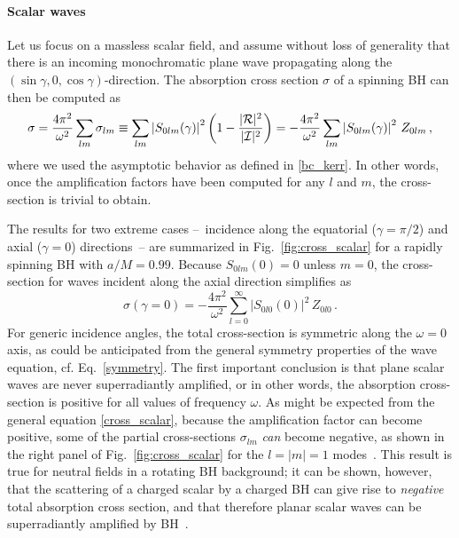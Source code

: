 \documentclass[11pt]{article}
\newcommand{\be}{\begin{equation}}
\newcommand{\ee}{\end{equation}}
\numberwithin{equation}{section} %
\begin{document}
\paragraph{Scalar waves}
Let us focus on a massless scalar field, and assume without loss of generality that there is an incoming monochromatic plane wave propagating along the $(\sin\gamma,0,\cos\gamma)$-direction. The absorption cross section $\sigma$ of a spinning BH can then be computed as~\cite{Unruh:1976fm,Macedo:2013afa}
%
\be
\sigma=\frac{4\pi^2}{\omega^2}\sum_{lm}\sigma_{lm}\equiv\sum_{lm}\left|S_{0lm}(\gamma)\right|^2\left(1-\frac{|{\cal R}|^2}{|{\cal I}|^2}\right)=-\frac{4\pi^2}{\omega^2}\sum_{lm}\left|S_{0lm}(\gamma)\right|^2\,Z_{0lm}\,,\label{cross_scalar}
\ee
%
where we used the asymptotic behavior as defined in \eqref{bc_kerr}. In other words, once the amplification factors have been computed for any $l$ and $m$, the cross-section is trivial to obtain. 

The results for two extreme cases --~incidence along the equatorial ($\gamma=\pi/2$) and axial ($\gamma=0$) directions~-- are summarized in Fig.~\ref{fig:cross_scalar}
for a rapidly spinning BH with $a/M=0.99$. Because $S_{0lm}(0)=0$ unless $m=0$, the cross-section for waves incident along the axial direction simplifies as
\begin{equation}
 \sigma(\gamma=0)=-\frac{4\pi^2}{\omega^2}\sum_{l=0}^\infty\left|S_{0l0}(0)\right|^2\,Z_{0l0}\,.\label{sigma_scalar_gamma0}
\end{equation}
For generic incidence angles, the total cross-section is symmetric along the $\omega=0$ axis, as could be anticipated 
from the general symmetry properties of the wave equation, cf. Eq.~\eqref{symmetry}. The first important conclusion is 
that plane scalar waves are never superradiantly amplified, or in other words, the absorption cross-section is positive 
for all values of frequency $\omega$. As might be expected from the general equation \eqref{cross_scalar}, because the 
amplification factor can become positive, some of the partial cross-sections $\sigma_{lm}$ {\it can} become negative, as 
shown in the right panel of Fig.~\ref{fig:cross_scalar} for the $l=|m|=1$ modes~\cite{Macedo:2013afa}. This result is true for neutral fields in a rotating BH background;
it can be shown, however, that  the scattering of a charged scalar by a charged BH can give rise to {\it negative} total absorption cross section, and that therefore planar scalar waves can be superradiantly amplified by BH~\cite{Benone:2015bst,Benone:2019all}.
\end{document}
